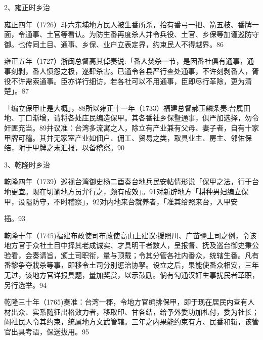 2、雍正时乡治

雍正四年（1726）斗六东埔地方民人被生番所杀，拾有番弓一把、箭五枝、番牌一面，令通事、土官等看认。为防生番再度杀人并令兵役、土官、乡保等加谨巡防守御。也传同土目、通事、乡保、业户立表定界，约束民人不得越界。86

雍正五年（1727）浙闽总督高其倬奏说:「番人焚杀一节，是因番社俱有通事，通事刻剥，番人愤怨之极，遂肆杀害。已通令各县严行查处通事，不许刻剥番人，胥役不许需索通事。臣亦详行细访，若各社可以不用通事，臣即尽行革除，更为清楚」。87

「编立保甲止是大概」，88所以雍正十一年（1733）福建总督郝玉麟条奏:台属田地、丁口渐增，请将各处庄民编造保甲。其各番社乡保暨通事，俱严加选择，勿令奸匪充当。89并议准：台湾多流寓之人，除立有产业兼有父母、妻子者，自有十家甲牌可稽。其并无家室产业如佃户、佣工、贸易之类，取具业主、房主、邻佑保结，附于甲牌之末汇报，以备稽察。90

3、乾隆时乡治

乾隆四年（1739）巡视台湾御史杨二酉奏台地兵民安帖情形说「保甲之法，行于台地更宜。现在切谕地方员弁行之，颇有成效」。91对新辟地方「耕种男妇编立保甲，设隘防守，不时稽察」，92对内地来台就养者，「准其给照来台，入甲安

\vfill
\begin{BookNotes}
\end{BookNotes}

\noindent 插。93

乾隆十年（1745)福建布政使司布政使高山上建议:援照川、广苗疆土司之例，令该地方官于众社土目中择其老成诚实、才具明干者数人，呈报督、抚及巡台御史秉公验看，会奏请旨，颁土司职衔，量与顶戴；令其分管各社内番众，统辖生番。凡有番黎争夺戕杀等事，即移令土司分别惩治协拏。设立之后，果能使番众相安，三年无过，该地方官详报具题，量加奖赏，以示鼓励。倘有勾通汉奸生事扰民者革职，另行选举。94

乾隆三十年（1765)奏准：台湾一郡，令地方官编排保甲，即于现在居民内查有人材出众、实系随征出格效力者，移取印、甘各结，给予外委功加札付，委为社长；阖社民人令其约束，统属地方文武管辖。三年之内果能约束有方、民番和辑，该管官出具考语，保送拔用。95

